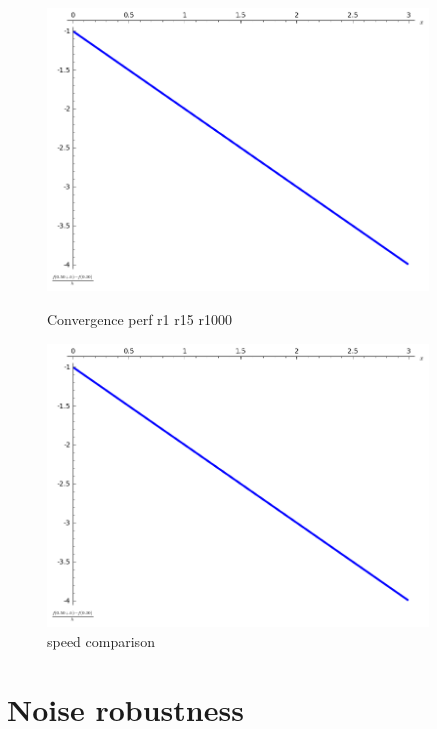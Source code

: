 \documentclass[a4paper]{article}
\begin{document}
\begin{figure}[!ht]
    \centering
    \begin{minipage}{0.45\textwidth}
        \centering
        \includegraphics[width=0.9\textwidth]{illustration1.png} %
        \caption{Convergence perf r1 r15 r1000}
    \end{minipage}\hfill
    \begin{minipage}{0.45\textwidth}
        \centering
        \includegraphics[width=0.9\textwidth]{illustration1.png} %
        \caption{speed comparison}
    \end{minipage}
\end{figure}



\section{Noise robustness}
 
\end{document}
